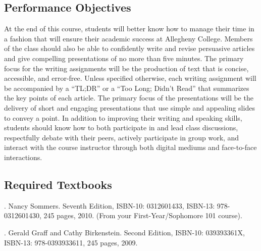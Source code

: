 \subsection*{Performance Objectives}

At the end of this course, students will better know how to manage their time in a fashion that will ensure their
academic success at Allegheny College. Members of the class should also be able to confidently write and revise
persuasive articles and give compelling presentations of no more than five minutes. The primary focus for the writing
assignments will be the production of text that is concise, accessible, and error-free. Unless specified otherwise, each
writing assignment will be accompanied by a ``TL;DR'' or a ``Too Long; Didn't Read'' that summarizes the key points of
each article. The primary focus of the presentations will be the delivery of short and engaging presentations that use
simple and appealing slides to convey a point. In addition to improving their writing and speaking skills, students
should know how to both participate in and lead class discussions, respectfully debate with their peers, actively
participate in group work, and interact with the course instructor through both digital mediums and face-to-face
interactions.

\subsection*{Required Textbooks}


. Nancy Sommers. Seventh Edition, ISBN-10: 0312601433, ISBN-13: 978-0312601430,
245 pages, 2010. (From your First-Year/Sophomore 101 course).


. Gerald Graff and Cathy Birkenstein. Second Edition,
ISBN-10: 039393361X, ISBN-13: 978-0393933611, 245 pages, 2009.


